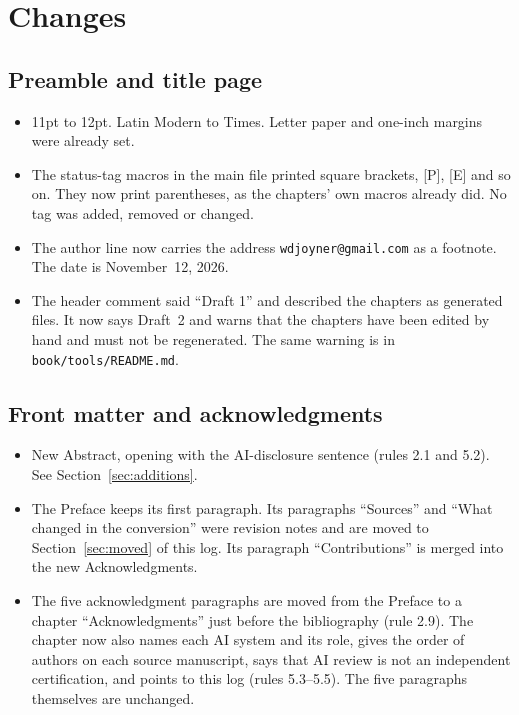 \documentclass[12pt,letterpaper]{article}
\begin{document}
\section{Changes}
\subsection{Preamble and title page}
\begin{itemize}[leftmargin=*]
\item 11pt to 12pt. Latin Modern to Times. Letter paper and one-inch margins were already set.
\item The status-tag macros in the main file printed square brackets, [P], [E] and so on. They now print parentheses, as the chapters' own macros already did. No tag was added, removed or changed.
\item The author line now carries the address \texttt{wdjoyner@gmail.com} as a footnote. The date is November~12, 2026.
\item The header comment said ``Draft 1'' and described the chapters as generated files. It now says Draft~2 and warns that the chapters have been edited by hand and must not be regenerated. The same warning is in \texttt{book/tools/README.md}.
\end{itemize}

\subsection{Front matter and acknowledgments}
\begin{itemize}[leftmargin=*]
\item New Abstract, opening with the AI-disclosure sentence (rules 2.1 and 5.2). See Section~\ref{sec:additions}.
\item The Preface keeps its first paragraph. Its paragraphs ``Sources'' and ``What changed in the conversion'' were revision notes and are moved to Section~\ref{sec:moved} of this log. Its paragraph ``Contributions'' is merged into the new Acknowledgments.
\item The five acknowledgment paragraphs are moved from the Preface to a chapter ``Acknowledgments'' just before the bibliography (rule 2.9). The chapter now also names each AI system and its role, gives the order of authors on each source manuscript, says that AI review is not an independent certification, and points to this log (rules 5.3--5.5). The five paragraphs themselves are unchanged.
\end{itemize}
\end{document}
